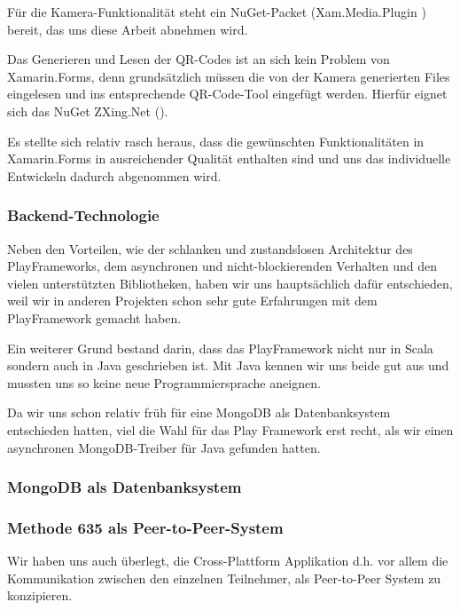 Für die Kamera-Funktionalität steht ein NuGet-Packet (Xam.Media.Plugin \cite{xam-media-plugin}) bereit, das uns diese Arbeit abnehmen wird.

Das Generieren und Lesen der QR-Codes ist an sich kein Problem von Xamarin.Forms, denn grundsätzlich müssen die von der Kamera generierten Files eingelesen und ins entsprechende QR-Code-Tool eingefügt werden. Hierfür eignet sich das NuGet ZXing.Net (\cite{zxing.net}). 

Es stellte sich relativ rasch heraus, dass die gewünschten Funktionalitäten in Xamarin.Forms in ausreichender Qualität enthalten sind und uns das individuelle Entwickeln dadurch abgenommen wird.

\subsubsection{Backend-Technologie}
Neben den Vorteilen, wie der schlanken und zustandslosen Architektur des PlayFrameworks, dem asynchronen und nicht-blockierenden Verhalten und den vielen unterstützten Bibliotheken, haben wir uns hauptsächlich dafür entschieden, weil wir in anderen Projekten schon sehr gute Erfahrungen mit dem PlayFramework gemacht haben.

Ein weiterer Grund bestand darin, dass das PlayFramework nicht nur in Scala sondern auch in Java geschrieben ist. Mit Java kennen wir uns beide gut aus und mussten uns so keine neue Programmiersprache aneignen.

Da wir uns schon relativ früh für eine MongoDB als Datenbanksystem entschieden hatten, viel die Wahl für das Play Framework erst recht, als wir einen asynchronen MongoDB-Treiber für Java gefunden hatten.

\subsubsection{MongoDB als Datenbanksystem}

\subsubsection{Methode 635 als Peer-to-Peer-System}
Wir haben uns auch überlegt, die Cross-Plattform Applikation d.h. vor allem die Kommunikation zwischen den einzelnen Teilnehmer, als Peer-to-Peer System \cite{Peer2Peer} zu konzipieren.


